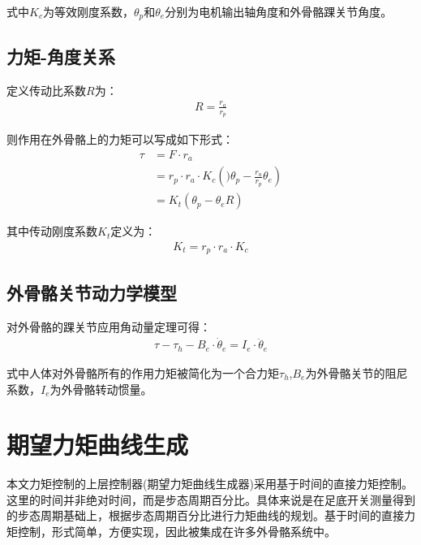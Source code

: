 式中$K_c$为等效刚度系数，$\theta_p$和$\theta_e$分别为电机输出轴角度和外骨骼踝关节角度。

\subsection{力矩-角度关系}

定义传动比系数$R$为：
\begin{align}
    R = \frac{r_a}{r_p}
\end{align}

则作用在外骨骼上的力矩可以写成如下形式：
\begin{align}
\tau &=F \cdot r_{a} \\ &=r_{p} \cdot r_{a} \cdot K_{c}\left()\theta_{p}-\frac{r_{a}}{r_{p}} \theta_{e}\right) \\ &=K_{t}\left(\theta_{p}-\theta_{e} R\right) 
\end{align}

其中传动刚度系数$K_t$定义为：
\begin{align}
    K_t = r_p\cdot r_a \cdot K_c
\end{align}

\subsection{外骨骼关节动力学模型}

对外骨骼的踝关节应用角动量定理可得：
\begin{align}
    \tau-\tau_{h}-B_{e} \cdot \dot{\theta}_{e}=I_{e} \cdot \ddot{\theta}_{e}
\end{align}

式中人体对外骨骼所有的作用力矩被简化为一个合力矩$\tau_h$,$B_e$为外骨骼关节的阻尼系数，$I_e$为外骨骼转动惯量。

\section{期望力矩曲线生成}

本文力矩控制的上层控制器(期望力矩曲线生成器)采用基于时间的直接力矩控制。这里的时间并非绝对时间，而是步态周期百分比。具体来说是在足底开关测量得到的步态周期基础上，根据步态周期百分比进行力矩曲线的规划。基于时间的直接力矩控制，形式简单，方便实现，因此被集成在许多外骨骼系统中。

